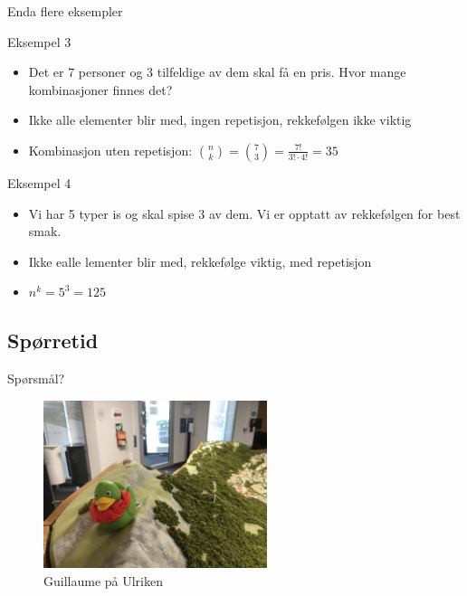 \begin{frame}{Enda flere eksempler}
\begin{block}{Eksempel 3}
\begin{itemize}
\item Det er 7 personer og 3 tilfeldige av dem skal få en pris. Hvor mange kombinasjoner finnes det?
\item Ikke alle elementer blir med, ingen repetisjon, rekkefølgen ikke viktig 
\item Kombinasjon uten repetisjon: $\binom{n}{k}=\binom{7}{3}=\frac{7!}{3!\cdot 4!}=35$
\end{itemize}
\end{block}

\begin{block}{Eksempel 4}
\begin{itemize}
\item Vi har 5 typer is og skal spise 3 av dem. Vi er opptatt av rekkefølgen for best smak.
\item Ikke ealle lementer blir med, rekkefølge viktig, med repetisjon
\item $n^k=5^3=125$
\end{itemize}
\end{block}
\end{frame}

\subsection*{Spørretid}
\begin{frame}{Spørsmål?}
    \begin{figure}
        \centering
        \includegraphics[height = 4.9cm]{images/guillaume11.jpg}
        \caption{Guillaume på Ulriken}
        \label{fig:guillaume11}
    \end{figure}
\end{frame}

